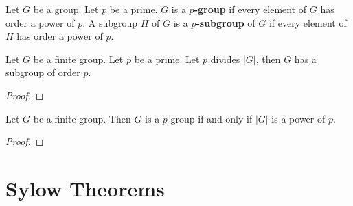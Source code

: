 \begin{definition}
	Let $G$ be a group. Let $p$ be a prime. $G$ is a \textbf{$p$-group} if every element of $G$ has order a power of $p$.
	A subgroup $H$ of $G$ is a \textbf{$p$-subgroup} of $G$ if every element of $H$ has order a power of $p$.
\end{definition}
\begin{theorem}[Cauchy]
	Let $G$ be a finite group. Let $p$ be a prime.
	Let $p$ divides $|G|$, then $G$ has a subgroup of order $p$.
\end{theorem}
\begin{proof}
\end{proof}
\begin{corollary}
	Let $G$ be a finite group. Then $G$ is a $p$-group if and only if $|G|$ is a power of $p$.
\end{corollary}
\begin{proof}
\end{proof}
\section{Sylow Theorems}

